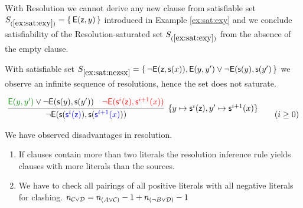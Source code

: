 \begin{example}
	With Resolution we cannot derive any new clause from satisfiable set 
	$S_{(\ref{ex:sat:exy})  } = \{\,{\mathsf{E}}({\mathsf z},y)\,\}$ 
	introduced in Example \ref{ex:sat:exy} and we conclude satisfiability 
	of the Resolution-saturated set $S_{(\ref{ex:sat:exy})  }$ from the absence of the empty clause.
\end{example}

\begin{example}\label{ex:sat:nezsx}
	With satisfiable set $S_{\ref{ex:sat:nezsx}} = \{\, 
		\lnot{\mathsf{E}}({\mathsf z},{\mathsf s}(x)), {\mathsf{E}}(y,y') \lor \lnot {\mathsf{E}}({\mathsf s}(y),{\mathsf s}(y')
		\,\}$
		we observe an infinite sequence of resolutions,
		hence the set does not saturate.
		
	\begin{gather*}
	\infer
	[\{y\mapsto\msucc^i(\mzero), y'\mapsto\msucc^{i+1}(x)\}]
	{
		\lnot \mE(\msucc({\colN\msucc^{i}(\mzero)}),\msucc({\colN\msucc^{i+1}(x)})) 
	}{
		{\colHi\mE(y,y')} \lor \lnot \mE(\msucc(y),\msucc(y')) 
		&{\colLo \lnot\mE(\msucc^i(\mzero),\msucc^{i+1}(x))}
	}
	\tag{$i\geq 0$}
	\end{gather*}
\end{example}

We have observed disadvantages in resolution. 

\begin{enumerate}
	\item If clauses contain more than two literals the resolution inference rule yields clauses with more literals than the sources.
	\item We have to check all pairings 
	of all positive literals with all negative literals for clashing.
	$n_{{\mathcal C}\lor{\mathcal D}} = n_{(A\lor{\mathcal C})} -1 + n_{(\lnot B\lor{\mathcal D})}-1$
\end{enumerate}

